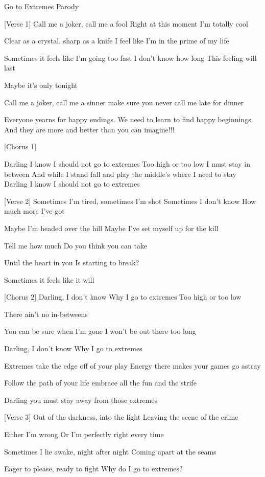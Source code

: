 \documentclass[12pt,letterpaper]{book}
\begin{document}
    
Go to Extremes Parody

[Verse 1]
Call me a joker, call me a fool
Right at this moment I'm totally cool

Clear as a crystal, sharp as a knife
I feel like I'm in the prime of my life

Sometimes it feels like I'm going too fast
I don't know how long
This feeling will last

Maybe it's only tonight

Call me a joker, call me a sinner make sure you never call me late for dinner

Everyone yearns for happy endings. We need to learn to find happy beginnings. And they are more and better than you can imagine!!!

[Chorus 1]

Darling I know I should not go to extremes
Too high or too low I must stay in between
And while I stand fall and play the middle's where I need to stay
Darling I know I should not go to extremes

[Verse 2]
Sometimes I'm tired, sometimes I'm shot
Sometimes I don't know
How much more I've got

Maybe I'm headed over the hill
Maybe I've set myself up for the kill

Tell me how much
Do you think you can take

Until the heart in you
Is starting to break?

Sometimes it feels like it will

[Chorus 2]
Darling, I don't know
Why I go to extremes
Too high or too low

There ain't no in-betweens

You can be sure when I'm gone
I won't be out there too long

Darling, I don't know
Why I go to extremes

Extremes take the edge off of your play Energy there makes your games go astray

Follow the path of your life embrace all the fun and the strife

Darling you must stay away from those extremes

[Verse 3]
Out of the darkness, into the light
Leaving the scene of the crime

Either I'm wrong
Or I'm perfectly right every time

Sometimes I lie awake, night after night
Coming apart at the seams

Eager to please, ready to fight
Why do I go to extremes?
\end{document}
